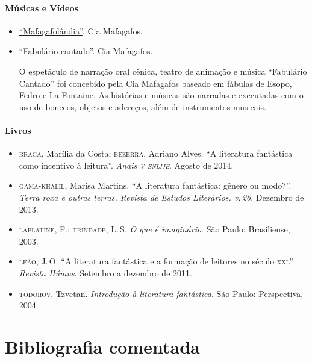 \documentclass[11pt]{extarticle}
\begin{document}
\paragraph{Músicas e Vídeos}

\begin{itemize}
\item \href{https://www.youtube.com/watch?v=MYZm-aR2IJU}{``Mafagafolândia''}. Cia Mafagafos. 


\item \href{https://www.youtube.com/watch?v=0tWcd7Xvbbs}{``Fabulário cantado''}. Cia Mafagafos. 

O espetáculo de narração oral cênica, teatro de animação e música ``Fabulário Cantado'' foi concebido pela Cia Mafagafos baseado em fábulas de Esopo, Fedro e La Fontaine.  As histórias e músicas são narradas e executadas com o uso de bonecos, objetos e adereços, além de instrumentos musicais. 


\end{itemize}


\paragraph{Livros}

\begin{itemize}
\item \textsc{braga}, Marília da Costa; \textsc{bezerra}, Adriano Alves. ``A literatura fantástica como incentivo à leitura''. \textit{Anais \textsc{v enlije}}. Agosto de 2014.

\item \textsc{gama-khalil}, Marisa Martins. ``A literatura fantástica: gênero ou modo?''. \textit{Terra roxa e outras terras. Revista de Estudos Literários. v.\,26}. Dezembro de 2013. 

\item \textsc{laplatine}, F.; \textsc{trindade}, L.\,S. \textit{O que é imaginário}. São Paulo: Brasiliense, 2003. 

\item \textsc{leão}, J.\,O. ``A literatura fantástica e a formação de leitores no século \textsc{xxi}.'' \textit{Revista Húmus}. Setembro a dezembro de 2011. 

\item \textsc{todorov}, Tzvetan. \textit{Introdução à literatura fantástica}. São Paulo: Perspectiva, 2004.
\end{itemize}

\section{Bibliografia comentada}
\end{document}
